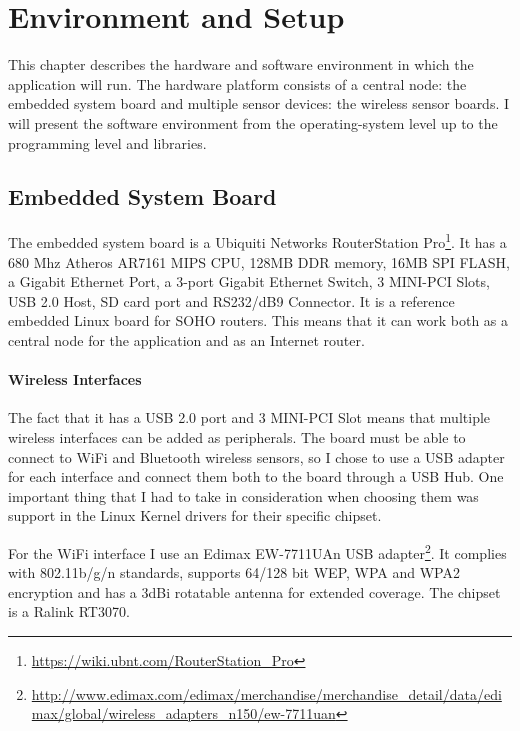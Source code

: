 \chapter{Environment and Setup}
\label{ch:environment}

This chapter describes the hardware and software environment in which the application will run. The hardware platform consists of a central node: the embedded system board and multiple sensor devices: the wireless sensor boards. I will present the software environment from the operating-system level up to the programming level and libraries.

\section{Embedded System Board}
\label{sec:routerstation}

The embedded system board is a Ubiquiti Networks RouterStation Pro\footnote{\url{https://wiki.ubnt.com/RouterStation_Pro}}. It has a 680 Mhz Atheros AR7161 MIPS CPU, 128MB DDR memory, 16MB SPI FLASH, a Gigabit Ethernet Port, a 3-port Gigabit Ethernet Switch, 3 MINI-PCI Slots, USB 2.0 Host, SD card port and RS232/dB9 Connector. It is a reference embedded Linux board for SOHO routers. This means that it can work both as a central node for the application and as an Internet router. 

\subsubsection{Wireless Interfaces}

The fact that it has a USB 2.0 port and 3 MINI-PCI Slot means that multiple wireless interfaces can be added as peripherals. The board must be able to connect to WiFi and Bluetooth wireless sensors, so I chose to use a USB adapter for each interface and connect them both to the board through a USB Hub. One important thing that I had to take in consideration when choosing them was support in the Linux Kernel drivers for their specific chipset.

For the WiFi interface I use an Edimax EW-7711UAn USB adapter\footnote{\url{http://www.edimax.com/edimax/merchandise/merchandise_detail/data/edimax/global/wireless_adapters_n150/ew-7711uan}}. It complies with 802.11b/g/n standards, supports 64/128 bit WEP, WPA and WPA2 encryption and has a 3dBi rotatable antenna for extended coverage. The chipset is a Ralink RT3070.

